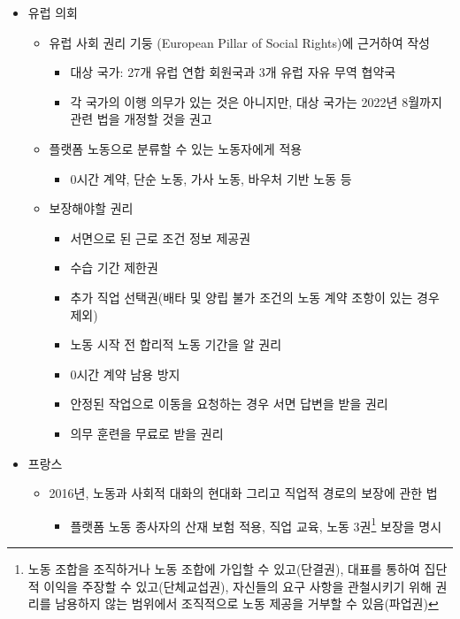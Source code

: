 \begin{itemize}
\item 유럽 의회 \citep{Expert-Group:2021wz, The-European-Parliament:2019wx}
	\begin{itemize}
	\item 유럽 사회 권리 기둥 (European Pillar of Social Rights)에 근거하여 작성
		\begin{itemize}
		\item 대상 국가: 27개 유럽 연합 회원국과 3개 유럽 자유 무역 협약국
		\item 각 국가의 이행 의무가 있는 것은 아니지만, 대상 국가는 2022년 8월까지 관련 법을 개정할 것을 권고
		\end{itemize}
	\item 플랫폼 노동으로 분류할 수 있는 노동자에게 적용
		\begin{itemize}
		\item 0시간 계약, 단순 노동, 가사 노동, 바우처 기반 노동 등
		\end{itemize}
	\item 보장해야할 권리
		\begin{itemize}
		\item 서면으로 된 근로 조건 정보 제공권
		\item 수습 기간 제한권
		\item 추가 직업 선택권(배타 및 양립 불가 조건의 노동 계약 조항이 있는 경우 제외)
		\item 노동 시작 전 합리적 노동 기간을 알 권리
		\item 0시간 계약 남용 방지
		\item 안정된 작업으로 이동을 요청하는 경우 서면 답변을 받을 권리
		\item 의무 훈련을 무료로 받을 권리
		\end{itemize}
	\end{itemize}
\item 프랑스 \citep{han-insang-sindong-yun:2019aa}
	\begin{itemize}
	\item 2016년, 노동과 사회적 대화의 현대화 그리고 직업적 경로의 보장에 관한 법
		\begin{itemize}
		\item 플랫폼 노동 종사자의 산재 보험 적용, 직업 교육, 노동 3권\footnote{노동 조합을 조직하거나 노동 조합에 가입할 수 있고(단결권), 대표를 통하여 집단적 이익을 주장할 수 있고(단체교섭권), 자신들의 요구 사항을 관철시키기 위해 권리를 남용하지 않는 범위에서 조직적으로 노동 제공을 거부할 수 있음(파업권)} 보장을 명시
		\end{itemize}
	\end{itemize}

\end{itemize}

